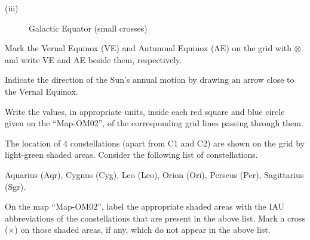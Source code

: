 \begin{description}
\begin{description}
  \item[(iii)] Galactic Equator (small crosses)
  \end{description}
\item[(OM02.5)] Mark the Vernal Equinox (VE) and Autumnal Equinox (AE) on the
  grid with $\otimes$ and write VE and AE beside them, respectively.
\item[(OM02.6)] Indicate the direction of the Sun's annual motion by drawing
  an arrow close to the Vernal Equinox.
\item[(OM02.7)] Write the values, in appropriate units, inside each red square
  and blue circle given on the ``Map-OM02'', of the corresponding grid lines
  passing through them.
\item[(OM02.8)] The location of 4 constellations (apart from C1 and C2) are
  shown on the grid by light-green shaded areas. Consider the following list
  of constellations.

  Aquarius (Aqr), Cygnus (Cyg), Leo (Leo), Orion (Ori), Perseus (Per),
  Sagittarius (Sgr).

  On the map ``Map-OM02'', label the appropriate shaded areas with the IAU
  abbreviations of the constellations that are present in the above list.
  Mark a cross ($\times$) on those shaded areas, if any, which do not appear
  in the above list.
\end{description}
